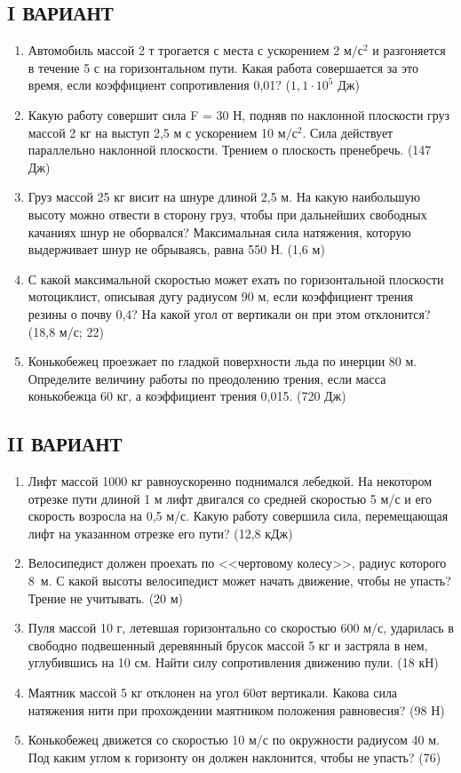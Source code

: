 \documentclass[a6paper, 11pt]{diss_4}
\renewcommand{\'}{\,'}
\begin{document}
\subsection{I ВАРИАНТ}
\begin{enumerate}

\item Автомобиль массой 2 т трогается с места с ускорением 2 $м/с^2$ и разгоняется в течение 5 с на горизонтальном пути. Какая работа совершается за это время, если коэффициент сопротивления 0,01? ($1,1\cdot10^5$ Дж)
\item Какую работу совершит сила F = 30 Н, подняв по наклонной плоскости груз массой 2 кг на выступ 2,5 м с ускорением 10 $м/с^2$. Сила действует параллельно наклонной плоскости. Трением о плоскость пренебречь. (147 Дж)
\item Груз массой 25 кг висит на шнуре длиной 2,5 м. На какую наибольшую высоту можно отвести в сторону груз, чтобы при дальнейших свободных качаниях шнур не оборвался? Максимальная сила натяжения, которую выдерживает шнур не обрываясь, равна 550 Н. (1,6 м)
\item С какой максимальной скоростью может ехать по горизонтальной плоскости мотоциклист, описывая дугу радиусом 90 м, если коэффициент трения резины о почву 0,4? На какой угол от вертикали он при этом отклонится? (18,8 м/с; 22\textdegree)
\item Конькобежец проезжает по гладкой поверхности льда по инерции 80 м. Определите величину работы по преодолению трения, если масса конькобежца 60 кг, а коэффициент трения 0,015. (720 Дж)

\end{enumerate}


\subsection{II ВАРИАНТ}
\begin{enumerate}

\item Лифт массой 1000 кг равноускоренно поднимался лебедкой. На некотором отрезке пути длиной 1 м лифт двигался со средней скоростью 5 м/с и его скорость возросла на 0,5 м/с. Какую работу совершила сила, перемещающая лифт на указанном отрезке его пути?
(12,8 кДж)
\item Велосипедист должен проехать по <<чертовому колесу>>, радиус которого 8 м. С какой высоты велосипедист может начать движение, чтобы не упасть? Трение не учитывать.
(20 м)
\item Пуля массой 10 г, летевшая горизонтально со скоростью 600 м/с, ударилась в свободно подвешенный деревянный брусок массой 5 кг и застряла в нем, углубившись на 10 см. Найти силу сопротивления движению пули.
(18 кН)
\item Маятник массой 5 кг отклонен на угол 60\textdegree от вертикали. Какова сила натяжения нити при прохождении маятником положения равновесия?
(98 Н)
\item Конькобежец движется со скоростью 10 м/с по окружности радиусом 40 м. Под каким углом к горизонту он должен наклонится, чтобы не упасть?
(76\textdegree)

\end{enumerate}
\end{document}
